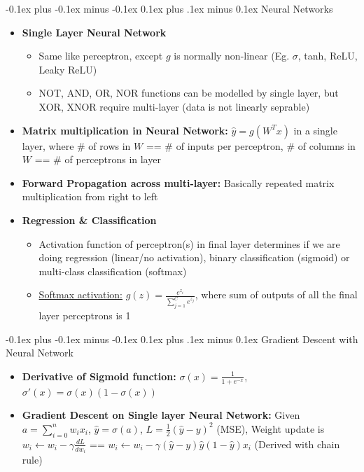 \documentclass[landscape]{article}
\makeatletter
\renewcommand{\subsection}{\@startsection{subsection}{2}{0mm}%
  {-0.1ex plus -0.1ex minus -0.1ex}%
  {0.1ex plus .1ex minus 0.1ex}%
{\normalfont\scriptsize\bfseries}}
\makeatother
\begin{document}
\begin{multicols*}{5}
        \subsection{Neural Networks}
        \begin{itemize}
          \item \textbf{Single Layer Neural Network} 
          \begin{itemize}
            \item Same like perceptron, except $g$ is normally non-linear (Eg. $\sigma$, tanh, ReLU, Leaky ReLU)
            \item NOT, AND, OR, NOR functions can be modelled by single layer, but XOR, XNOR require multi-layer (data is not linearly seprable)
          \end{itemize}
          \item \textbf{Matrix multiplication in Neural Network:} $\hat{y} = g(W^Tx)$ in a single layer, where \# of rows in $W$ == \# of inputs per perceptron, \# of columns in $W$ == \# of perceptrons in layer
          \item \textbf{Forward Propagation across multi-layer:} Basically repeated matrix multiplication from right to left
          \item \textbf{Regression \& Classification}
          \begin{itemize}
            \item Activation function of perceptron(s) in final layer determines if we are doing regression (linear/no activation), binary classification (sigmoid) or multi-class classification (softmax)
            \item \underline{Softmax activation:} $g(z) = \frac{e^{z_i}}{\sum_{j=1}^Ce^{z_j}}$, where sum of outputs of all the final layer perceptrons is 1
          \end{itemize}
        \end{itemize}

        \subsection{Gradient Descent with Neural Network}
        \begin{itemize}
          \item \textbf{Derivative of Sigmoid function:} $\sigma(x) = \frac{1}{1 + e^{-x}}$, $\sigma'(x)=\sigma(x)(1-\sigma(x))$
          \item \textbf{Gradient Descent on Single layer Neural Network:} Given $a = \sum_{i=0}^nw_ix_i$, $\hat{y}=\sigma(a)$, $L = \frac{1}{2}(\hat{y} - y)^2$ (MSE), Weight update is $w_i \leftarrow w_i - \gamma\frac{dL}{dw_i}$ == $w_i \leftarrow w_i - \gamma(\hat{y}-y)\hat{y}(1-\hat{y})x_i$ (Derived with chain rule)
        \end{itemize}


\end{multicols*}
\end{document}
